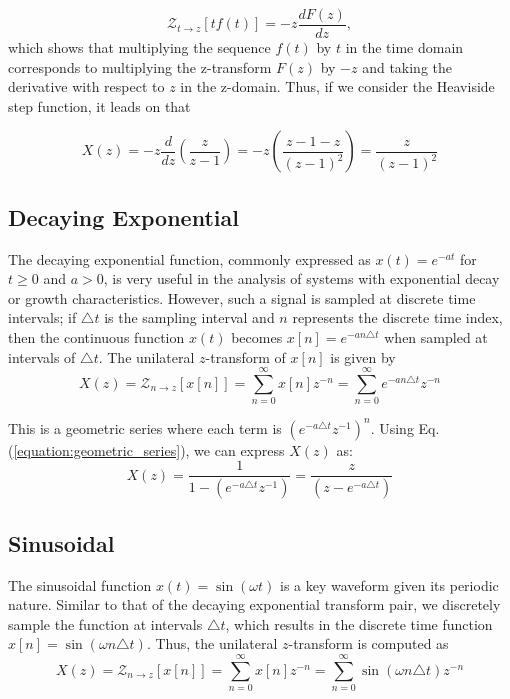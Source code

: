 \documentclass[a4paper]{report}
\begin{document}
\begin{equation}
\mathcal{Z}_{t \rightarrow z}[tf(t)] = -z \frac{dF(z)}{dz},
\end{equation}
which shows that multiplying the sequence $f(t)$ by $t$ in the time domain corresponds to multiplying the z-transform $F(z)$ by $-z$ and taking the derivative with respect to $z$ in the z-domain. Thus, if we consider the Heaviside step function, it leads on that 

\begin{equation}
X(z) = -z \frac{d}{dz} \left( \frac{z}{z-1} \right) = -z \left( \frac{z - 1 - z}{(z-1)^2} \right) = \frac{z}{(z-1)^2}
\end{equation}

\subsection{Decaying Exponential}
The decaying exponential function, commonly expressed as $x(t) = e^{-at}$ for $t \geq 0$ and $a > 0$, is very useful in the analysis of systems with exponential decay or growth characteristics. However, such a signal is sampled at discrete time intervals; if $\triangle t$ is the sampling interval and $n$ represents the discrete time index, then the continuous function $x(t)$ becomes $x[n] = e^{-an\triangle t}$ when sampled at intervals of $\triangle t$. The unilateral $z$-transform of $x[n]$ is given by
\begin{equation}
	X(z) = 	\mathcal{Z}_{n \rightarrow z}[x[n]] = \sum^{\infty}_{n = 0}x[n]z^{-n} = \sum^{\infty}_{n=0} e^{-an\triangle t}z^{-n}
\end{equation}

This is a geometric series where each term is $(e^{-a\triangle t}z^{-1})^n$. Using Eq. (\ref{equation:geometric_series}), we can express $X(z)$ as:
\begin{equation}
X(z) = \frac{1}{1 - (e^{-a\triangle t}z^{-1})}= \frac{z}{(z-e^{-a\triangle t})}
\end{equation}

\subsection{Sinusoidal}
The sinusoidal function $x(t) = \sin(\omega t)$ is a key waveform given its periodic nature. Similar to that of the decaying exponential transform pair, we discretely sample the function at intervals $\triangle t$, which results in the discrete time function $x[n] = \sin(\omega n \triangle t)$. Thus, the unilateral $z$-transform is computed as
\begin{equation}
X(z) = \mathcal{Z}_{n \rightarrow z}[x[n]] = \sum^{\infty}_{n = 0}x[n]z^{-n} = \sum^{\infty}_{n = 0} \sin(\omega n \triangle t)z^{-n}
\end{equation}
\end{document}
